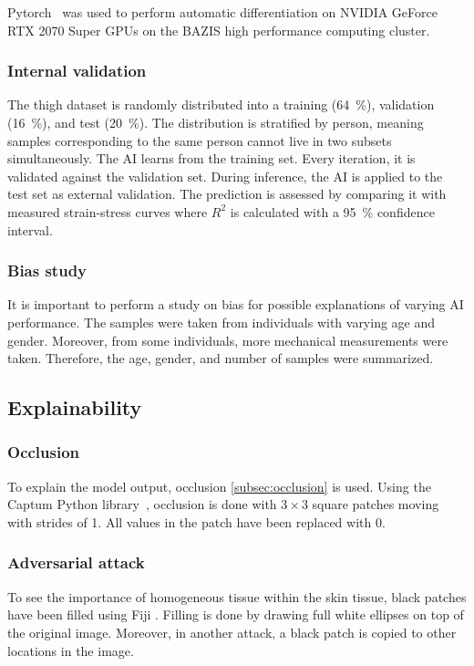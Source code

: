 Pytorch~ was used to perform automatic differentiation on NVIDIA GeForce RTX 2070 Super GPUs on the BAZIS high performance computing cluster.

\subsubsection{Internal validation}\label{subsec:skin_dataset}
The thigh dataset is randomly distributed into a training (\qty{64}{\percent}), validation (\qty{16}{\percent}), and test (\qty{20}{\percent}).
The distribution is stratified by person, meaning samples corresponding to the same person cannot live in two subsets simultaneously.
The AI learns from the training set.
Every iteration, it is validated against the validation set.
During inference, the AI is applied to the test set as external validation.
The prediction is assessed by comparing it with measured strain-stress curves where $R^2$ is calculated with a \qty{95}{\percent} confidence interval.

\subsubsection{Bias study}
It is important to perform a study on bias for possible explanations of varying AI performance.
The samples were taken from individuals with varying age and gender.
Moreover, from some individuals, more mechanical measurements were taken.
Therefore, the age, gender, and number of samples were summarized.


\subsection{Explainability}

\subsubsection{Occlusion}
To explain the model output, occlusion \cref{subsec:occlusion} is used.
Using the Captum Python library~, occlusion is done with $3\times3$ square patches moving with strides of 1.
All values in the patch have been replaced with 0.

\subsubsection{Adversarial attack}
To see the importance of homogeneous tissue within the skin tissue, black patches have been filled using Fiji .
Filling is done by drawing full white ellipses on top of the original image.
Moreover, in another attack, a black patch is copied to other locations in the image.
